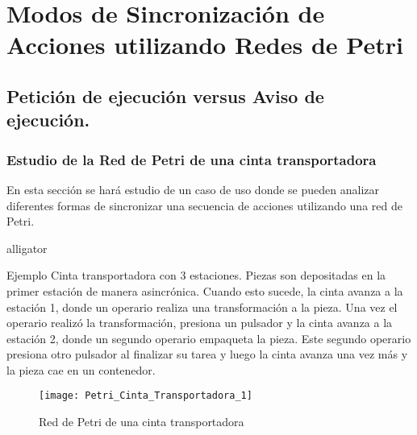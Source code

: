 \section{Modos de Sincronización de Acciones utilizando Redes de Petri}
\subsection{Petición de ejecución versus Aviso de ejecución.}
\subsubsection{Estudio de la Red de Petri de una cinta transportadora}
En esta sección se hará estudio de un caso de uso donde se pueden analizar
diferentes formas de sincronizar una secuencia de acciones utilizando una red de
Petri.\\

\begin{labeling}{alligator}
\item [Ejemplo]
Cinta transportadora con 3 estaciones. Piezas son depositadas en la primer
estación  de manera asincrónica. Cuando esto sucede, la cinta avanza a la
estación 1, donde un operario realiza una transformación a la pieza. Una vez el
operario realizó la transformación, presiona un pulsador y la cinta avanza a la
estación 2, donde un segundo operario empaqueta la pieza. Este segundo operario
presiona otro pulsador al finalizar su tarea y luego la cinta avanza una vez
más y la pieza cae en un contenedor.
\end{labeling}

\begin{figure}[H]
    \centering
    \texttt{[image: Petri\_Cinta\_Transportadora\_1]}
    \caption{Red de Petri de una cinta transportadora}
    \label{fig:petri_cinta_transportadora_1}
\end{figure}

